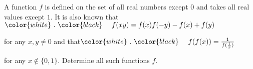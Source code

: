 A function $f$ is defined on the set of all real numbers except $0$ and takes all real values except $1$. It is also known that$\color{white}\ . \ \color{black}\ \quad f(xy)=f(x)f(-y)-f(x)+f(y)$

for any $x,y\not= 0$ and that$\color{white}\ . \ \color{black}\ \quad f(f(x))=\frac{1}{f(\frac{1}{x})}$

for any $x\not\in\{ 0,1\}$. Determine all such functions $f$.